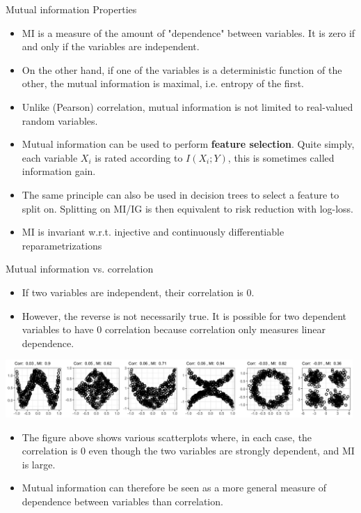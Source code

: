 \documentclass[11pt,compress,t,notes=noshow, xcolor=table]{beamer}
\begin{document}
\begin{vbframe} {Mutual information Properties}
\begin{itemize}
  \item MI is a measure of the amount of "dependence" between variables. It is zero if and only if the variables are independent.
  \item On the other hand, if one of the variables is a deterministic function of the other, the mutual information is maximal, i.e. entropy of the first.
 \item Unlike (Pearson) correlation, mutual information is not limited to real-valued random variables.
    \item Mutual information can be used to perform \textbf{feature selection}. Quite simply, each variable $X_i$ is rated according to $I(X_i;Y)$, this is sometimes called information gain.
  \item The same principle can also be used in decision trees to select a feature to split on. Splitting on MI/IG is then equivalent to risk reduction with log-loss.
  \item MI is invariant w.r.t. injective and continuously differentiable reparametrizations
\end{itemize}
\end{vbframe}

\begin{vbframe} {Mutual information vs. correlation}
  
\begin{itemize}
    \item If two variables are independent, their correlation is 0.
    \item However, the reverse is not necessarily true. It is possible for two dependent variables to have 0 correlation because correlation only measures linear dependence.
\end{itemize}
    
\begin{center}
\includegraphics[width = 0.99\textwidth]{figure/correlation_plot.png} \\
\end{center}

\begin{itemize}
    \item The figure above shows various scatterplots where, in each case, the correlation is 0 even though the two variables are strongly dependent, and MI is large. 
    \item Mutual information can therefore be seen as a more general measure of dependence between variables than correlation.
\end{itemize}

\end{vbframe}
\end{document}

